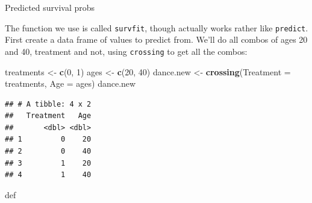 \documentclass[ignorenonframetext,]{beamer}
\newenvironment{Shaded}{\begin{snugshade}}{\end{snugshade}}
\newcommand{\DataTypeTok}[1]{\textcolor[rgb]{0.13,0.29,0.53}{#1}}
\newcommand{\DecValTok}[1]{\textcolor[rgb]{0.00,0.00,0.81}{#1}}
\newcommand{\KeywordTok}[1]{\textcolor[rgb]{0.13,0.29,0.53}{\textbf{#1}}}
\newcommand{\NormalTok}[1]{#1}
\newcommand{\StringTok}[1]{\textcolor[rgb]{0.31,0.60,0.02}{#1}}
\begin{document}
\begin{frame}[fragile]{Predicted survival probs}
\protect\hypertarget{predicted-survival-probs-1}{}

The function we use is called \texttt{survfit}, though actually works
rather like \texttt{predict}. First create a data frame of values to
predict from. We'll do all combos of ages 20 and 40, treatment and not,
using \texttt{crossing} to get all the combos:

\begin{Shaded}
\begin{Highlighting}[]
\NormalTok{treatments <-}\StringTok{ }\KeywordTok{c}\NormalTok{(}\DecValTok{0}\NormalTok{, }\DecValTok{1}\NormalTok{)}
\NormalTok{ages <-}\StringTok{ }\KeywordTok{c}\NormalTok{(}\DecValTok{20}\NormalTok{, }\DecValTok{40}\NormalTok{)}
\NormalTok{dance.new <-}\StringTok{ }\KeywordTok{crossing}\NormalTok{(}\DataTypeTok{Treatment =}\NormalTok{ treatments, }\DataTypeTok{Age =}\NormalTok{ ages)}
\NormalTok{dance.new}
\end{Highlighting}
\end{Shaded}

\begin{verbatim}
## # A tibble: 4 x 2
##   Treatment   Age
##       <dbl> <dbl>
## 1         0    20
## 2         0    40
## 3         1    20
## 4         1    40
\end{verbatim}

def

\end{frame}
\end{document}
